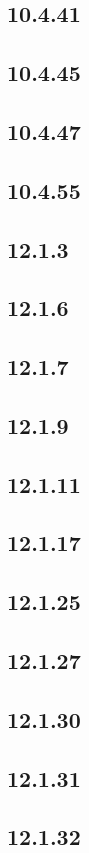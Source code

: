 \subsection*{10.4.41}
\subsection*{10.4.45}
\subsection*{10.4.47}
\subsection*{10.4.55}

\subsection*{12.1.3}
\subsection*{12.1.6}
\subsection*{12.1.7}
\subsection*{12.1.9}
\subsection*{12.1.11}
\subsection*{12.1.17}
\subsection*{12.1.25}
\subsection*{12.1.27}
\subsection*{12.1.30}
\subsection*{12.1.31}
\subsection*{12.1.32}

